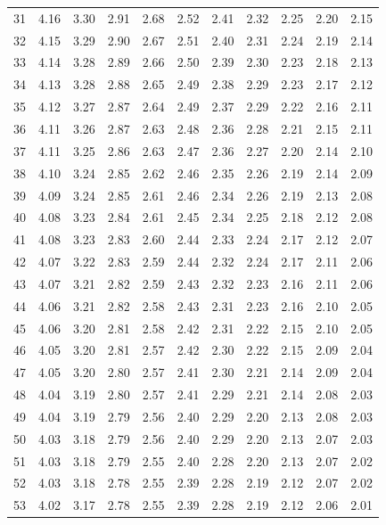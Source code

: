 \documentclass[
]{book}
\theoremstyle{definition}
\theoremstyle{definition}
\theoremstyle{definition}
\theoremstyle{definition}
\theoremstyle{remark}
\begin{document}
\begin{longtable}[]{@{}ccccccccccc@{}}
31 & 4.16 & 3.30 & 2.91 & 2.68 & 2.52 & 2.41 & 2.32 & 2.25 & 2.20 & 2.15 \\
32 & 4.15 & 3.29 & 2.90 & 2.67 & 2.51 & 2.40 & 2.31 & 2.24 & 2.19 & 2.14 \\
33 & 4.14 & 3.28 & 2.89 & 2.66 & 2.50 & 2.39 & 2.30 & 2.23 & 2.18 & 2.13 \\
34 & 4.13 & 3.28 & 2.88 & 2.65 & 2.49 & 2.38 & 2.29 & 2.23 & 2.17 & 2.12 \\
35 & 4.12 & 3.27 & 2.87 & 2.64 & 2.49 & 2.37 & 2.29 & 2.22 & 2.16 & 2.11 \\
36 & 4.11 & 3.26 & 2.87 & 2.63 & 2.48 & 2.36 & 2.28 & 2.21 & 2.15 & 2.11 \\
37 & 4.11 & 3.25 & 2.86 & 2.63 & 2.47 & 2.36 & 2.27 & 2.20 & 2.14 & 2.10 \\
38 & 4.10 & 3.24 & 2.85 & 2.62 & 2.46 & 2.35 & 2.26 & 2.19 & 2.14 & 2.09 \\
39 & 4.09 & 3.24 & 2.85 & 2.61 & 2.46 & 2.34 & 2.26 & 2.19 & 2.13 & 2.08 \\
40 & 4.08 & 3.23 & 2.84 & 2.61 & 2.45 & 2.34 & 2.25 & 2.18 & 2.12 & 2.08 \\
41 & 4.08 & 3.23 & 2.83 & 2.60 & 2.44 & 2.33 & 2.24 & 2.17 & 2.12 & 2.07 \\
42 & 4.07 & 3.22 & 2.83 & 2.59 & 2.44 & 2.32 & 2.24 & 2.17 & 2.11 & 2.06 \\
43 & 4.07 & 3.21 & 2.82 & 2.59 & 2.43 & 2.32 & 2.23 & 2.16 & 2.11 & 2.06 \\
44 & 4.06 & 3.21 & 2.82 & 2.58 & 2.43 & 2.31 & 2.23 & 2.16 & 2.10 & 2.05 \\
45 & 4.06 & 3.20 & 2.81 & 2.58 & 2.42 & 2.31 & 2.22 & 2.15 & 2.10 & 2.05 \\
46 & 4.05 & 3.20 & 2.81 & 2.57 & 2.42 & 2.30 & 2.22 & 2.15 & 2.09 & 2.04 \\
47 & 4.05 & 3.20 & 2.80 & 2.57 & 2.41 & 2.30 & 2.21 & 2.14 & 2.09 & 2.04 \\
48 & 4.04 & 3.19 & 2.80 & 2.57 & 2.41 & 2.29 & 2.21 & 2.14 & 2.08 & 2.03 \\
49 & 4.04 & 3.19 & 2.79 & 2.56 & 2.40 & 2.29 & 2.20 & 2.13 & 2.08 & 2.03 \\
50 & 4.03 & 3.18 & 2.79 & 2.56 & 2.40 & 2.29 & 2.20 & 2.13 & 2.07 & 2.03 \\
51 & 4.03 & 3.18 & 2.79 & 2.55 & 2.40 & 2.28 & 2.20 & 2.13 & 2.07 & 2.02 \\
52 & 4.03 & 3.18 & 2.78 & 2.55 & 2.39 & 2.28 & 2.19 & 2.12 & 2.07 & 2.02 \\
53 & 4.02 & 3.17 & 2.78 & 2.55 & 2.39 & 2.28 & 2.19 & 2.12 & 2.06 & 2.01 \\

\end{longtable}
\end{document}
